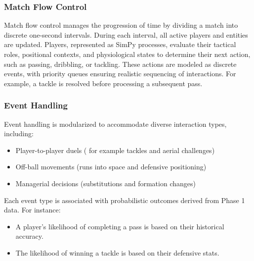 \documentclass[12pt]{article}
\begin{document}
\subsubsection{Match Flow Control}
Match flow control manages the progression of time by dividing a match into discrete one-second intervals. During each interval, all active players and entities are updated. Players, represented as SimPy processes, evaluate their tactical roles, positional contexts, and physiological states to determine their next action, such as passing, dribbling, or tackling. These actions are modeled as discrete events, with priority queues ensuring realistic sequencing of interactions. For example, a tackle is resolved before processing a subsequent pass.

\subsubsection{Event Handling}
Event handling is modularized to accommodate diverse interaction types, including:
\begin{itemize}
    \item Player-to-player duels ( for example tackles and aerial challenges)
    \item Off-ball movements (runs into space and defensive positioning)
    \item Managerial decisions (substitutions and formation changes)
\end{itemize}

Each event type is associated with probabilistic outcomes derived from Phase 1 data. For instance:
\begin{itemize}
    \item A player's likelihood of completing a pass is based on their historical accuracy.
    \item The likelihood of winning a tackle is based on their defensive stats.
\end{itemize}
\end{document}
